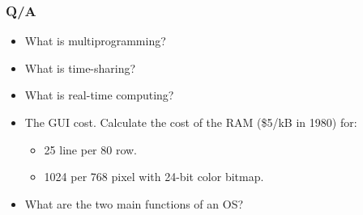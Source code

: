   \begin{frame}
    \frametitle{Q/A}
    \begin{itemize}
      \item What is multiprogramming? %
      \item What is time-sharing?
      \item What is real-time computing?
      \item The GUI cost. Calculate the cost of the RAM (\$5/kB in 1980) for:
      \begin{itemize}
        \item 25 line per 80 row. %
        \item 1024 per 768 pixel with 24-bit color bitmap. %
      \end{itemize}
      \item What are the two main functions of an OS? %
    \end{itemize}
  \end{frame}
